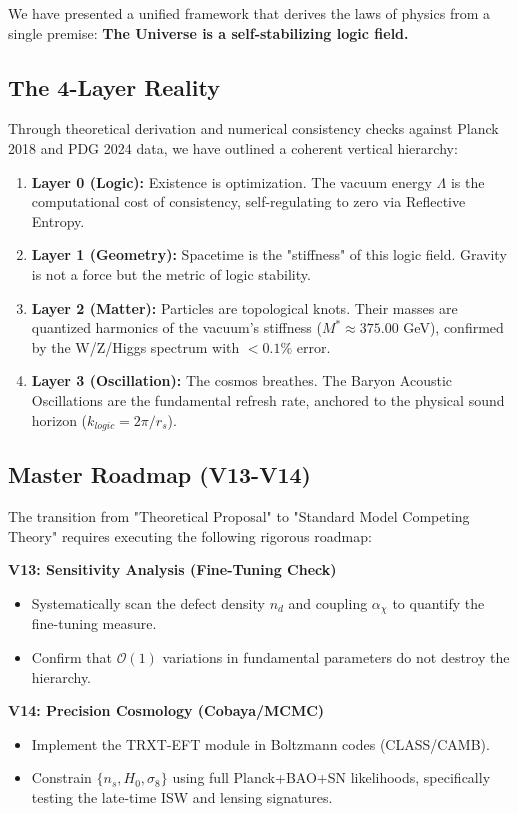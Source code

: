\documentclass[a4paper,12pt]{article}
\begin{document}
We have presented a unified framework that derives the laws of physics from a single premise: \textbf{The Universe is a self-stabilizing logic field.}

\subsection{The 4-Layer Reality}
Through theoretical derivation and numerical consistency checks against Planck 2018 and PDG 2024 data, we have outlined a coherent vertical hierarchy:
\begin{enumerate}
    \item \textbf{Layer 0 (Logic):} Existence is optimization. The vacuum energy $\Lambda$ is the computational cost of consistency, self-regulating to zero via Reflective Entropy.
    \item \textbf{Layer 1 (Geometry):} Spacetime is the "stiffness" of this logic field. Gravity is not a force but the metric of logic stability.
    \item \textbf{Layer 2 (Matter):} Particles are topological knots. Their masses are quantized harmonics of the vacuum's stiffness ($M^* \approx 375.00$ GeV), confirmed by the W/Z/Higgs spectrum with $<0.1\%$ error.
    \item \textbf{Layer 3 (Oscillation):} The cosmos breathes. The Baryon Acoustic Oscillations are the fundamental refresh rate, anchored to the physical sound horizon ($k_{logic} = 2\pi/r_s$).
\end{enumerate}

\subsection{Master Roadmap (V13-V14)}
The transition from "Theoretical Proposal" to "Standard Model Competing Theory" requires executing the following rigorous roadmap:

\textbf{V13: Sensitivity Analysis (Fine-Tuning Check)}
\begin{itemize}
    \item Systematically scan the defect density $n_d$ and coupling $\alpha_\chi$ to quantify the fine-tuning measure.
    \item Confirm that $\mathcal{O}(1)$ variations in fundamental parameters do not destroy the hierarchy.
\end{itemize}

\textbf{V14: Precision Cosmology (Cobaya/MCMC)}
\begin{itemize}
    \item Implement the TRXT-EFT module in Boltzmann codes (CLASS/CAMB).
    \item Constrain $\{n_s, H_0, \sigma_8\}$ using full Planck+BAO+SN likelihoods, specifically testing the late-time ISW and lensing signatures.
\end{itemize}
\end{document}
